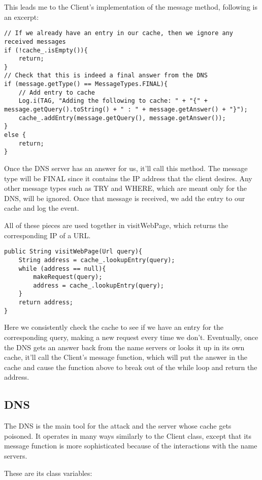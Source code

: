 \documentclass[a4paper, 12pt]{article} %
\begin{document}
This leads me to the Client's implementation of the message method, following is an excerpt:

\begin{lstlisting}
// If we already have an entry in our cache, then we ignore any received messages
if (!cache_.isEmpty()){
    return; 
}
// Check that this is indeed a final answer from the DNS
if (message.getType() == MessageTypes.FINAL){
	// Add entry to cache
    Log.i(TAG, "Adding the following to cache: " + "{" + message.getQuery().toString() + " : " + message.getAnswer() + "}");
    cache_.addEntry(message.getQuery(), message.getAnswer());
}
else {
    return;
}
\end{lstlisting}

Once the DNS server has an answer for us, it’ll call this method. The message type will be FINAL since it contains the IP address that the client desires. Any other message types such as TRY and WHERE, which are meant only for the DNS, will be ignored. Once that message is received, we add the entry to our cache and log the event. 

All of these pieces are used together in visitWebPage, which returns the corresponding IP of a URL.

\begin{lstlisting}
public String visitWebPage(Url query){
    String address = cache_.lookupEntry(query);
    while (address == null){
    	makeRequest(query);
    	address = cache_.lookupEntry(query);
    }
    return address;
}	
\end{lstlisting}

Here we consistently check the cache to see if we have an entry for the corresponding query, making a new request every time we don’t. Eventually, once the DNS gets an answer back from the name servers or looks it up in its own cache, it’ll call the Client’s message function, which will put the answer in the cache and cause the function above to break out of the while loop and return the address. 

\subsection{DNS}

The DNS is the main tool for the attack and the server whose cache gets poisoned. It operates in many ways similarly to the Client class, except that its message function is more sophisticated because of the interactions with the name servers.

These are its class variables:
\end{document}

